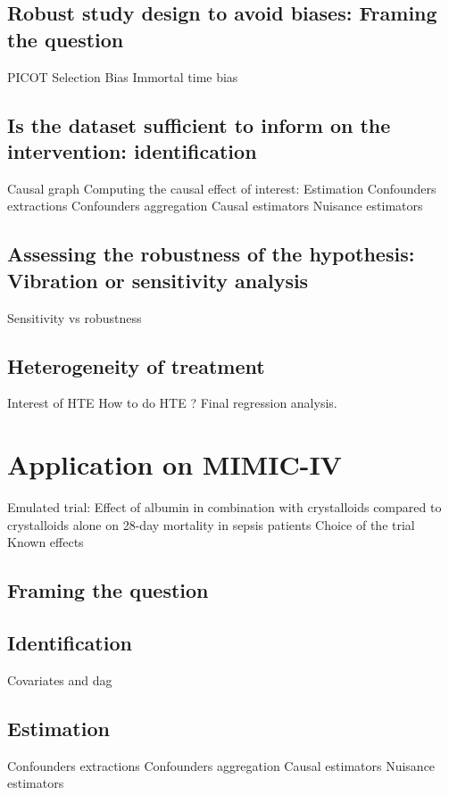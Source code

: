 \documentclass{report}
\begin{document}
\subsection{Robust study design to avoid biases: Framing the question}
PICOT
Selection Bias
Immortal time bias

\subsection{Is the dataset sufficient to inform on the intervention: identification}
Causal graph Computing the causal effect of interest: Estimation Confounders
extractions Confounders aggregation Causal estimators Nuisance estimators
\subsection{Assessing the robustness of the hypothesis: Vibration or sensitivity
  analysis}\label{subsec:causal_tuto:vibration_analysis}

Sensitivity vs robustness

\subsection{Heterogeneity of treatment}
Interest of HTE
How to do HTE ? Final regression analysis.

\section{Application on MIMIC-IV}\label{sec:causal_tuto:application}

Emulated trial: Effect of albumin in combination with crystalloids compared to crystalloids alone on 28-day mortality in sepsis patients
Choice of the trial
Known effects

\subsection{Framing the question}\label{subsec:causal_tuto:framing_mimic}
\subsection{Identification}
Covariates and dag
\subsection{Estimation}
Confounders extractions
Confounders aggregation
Causal estimators
Nuisance estimators
\end{document}
